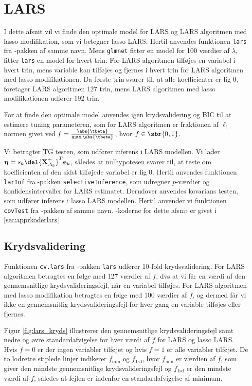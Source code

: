 \section{LARS}
I dette afsnit vil vi finde den optimale model for LARS og LARS algoritmen med lasso modifikation, som vi betegner lasso LARS. 
Hertil anvendes funktionen \texttt{lars} fra \Rlang-pakken af samme navn.
Mens \texttt{glmnet} fitter en model for 100 værdier af \(\lambda\), fitter \texttt{lars} en model for hvert trin.
For LARS algoritmen tilføjes en variabel i hvert trin, mens variable kan tilføjes og fjernes i hvert trin for LARS algoritmen med lasso modifikationen.
Da første trin svarer til, at alle koefficienter er lig 0, foretager LARS algoritmen 127 trin, mens LARS algoritmen med lasso modifikationen udfører 192 trin.

For at finde den optimale model anvendes igen krydsvalidering og BIC til at estimere tuning parameteren, som for LARS algoritmen er fraktionen af \(\ell_1\) normen givet ved \(f = \frac{\abs{\tbeta}}{\max \abs{\tbeta}}\), hvor \(f \in \sbr{0,1}\).

Vi betragter TG testen, som udfører inferens i LARS modellen.
Vi lader $\boldsymbol{\eta} = s_k \del{\textbf{X}^+_{\mathcal{A}_k}}^T \mathbf{e}_k$, således at nulhypotesen svarer til, at teste om koefficienten af den sidst tilføjede variabel er lig 0.
Hertil anvendes funktionen \texttt{larInf} fra \Rlang-pakken \texttt{selectiveInference}, som udregner \(p\)-værdier og konfidensintervaller for LARS estimatet.
Derudover anvendes kovarians testen, som udfører inferens i lasso LARS modellen.
Hertil anvender vi funktionen \texttt{covTest} fra \Rlang-pakken af samme navn. 
\Rlang-koderne for dette afsnit er givet i \ref{sec:apprkoderlars}.
\newpage
\subsection{Krydsvalidering}
Funktionen \texttt{cv.lars} fra \Rlang-pakken \texttt{lars} udfører 10-fold krydsvalidering.
For LARS algoritmen betragtes en følge med 127 værdier af $f$, dvs at vi får en værdi af den gennemsnitlige krydsvalideringsfejl, når en variabel tilføjes.
For LARS algoritmen med lasso modifikation betragtes en følge med 100 værdier af $f$, og dermed får vi ikke en gennemsnitlig krydsvalideringsfejl for hver gang en variable tilføjes eller fjernes.

Figur \ref{fig:lars_kryds} illustrerer den gennemsnitlige krydsvalideringsfejl samt nedre og øvre standardafvigelse for hver værdi af $f$ for LARS og lasso LARS.
Hvis $f = 0$ er der ingen variabler tilføjet og hvis $f=1$ er alle variabler tilføjet. 
De to lodrette stiplede linjer indikerer \(f_{\text{min}}\) og \(f_\text{1sd}\), hvor \(f_{\text{min}}\) er værdien af \(f\), som giver den mindste gennemsnitlige krydsvalideringsfejl og \(f_\text{1sd}\) er den mindste værdi af \(f\), således at fejlen er indenfor en standardafvigelse af minimum. 

